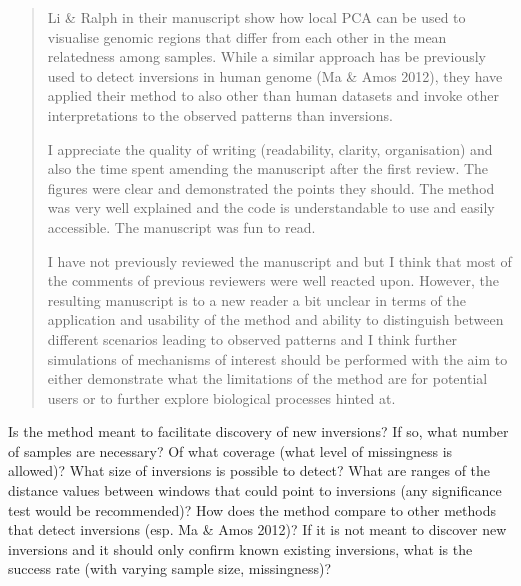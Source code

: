 \reply{
}


\begin{quote}
    Li \& Ralph in their manuscript show how local PCA can be used to visualise genomic regions that differ from each other in the mean relatedness among samples. While a similar approach has be previously used to detect inversions in human genome (Ma & Amos 2012), they have applied their method to also other than human datasets and invoke other interpretations to the observed patterns than inversions.

    I appreciate the quality of writing (readability, clarity, organisation) and also the time spent amending the manuscript after the first review. The figures were clear and demonstrated the points they should. The method was very well explained and the code is understandable to use and easily accessible. The manuscript was fun to read.

    I have not previously reviewed the manuscript and but I think that most of the comments of previous reviewers were well reacted upon. However, the resulting manuscript is to a new reader a bit unclear in terms of the application and usability of the method and ability to distinguish between different scenarios leading to observed patterns and I think further simulations of mechanisms of interest should be performed with the aim to either demonstrate what the limitations of the method are for potential users or to further explore biological processes hinted at.
\end{quote}

\begin{point}{}
    Is the method meant to facilitate discovery of new inversions? If so, what number of samples are necessary? Of what coverage (what level of missingness is allowed)? What size of inversions is possible to detect? What are ranges of the distance values between windows that could point to inversions (any significance test would be recommended)? How does the method compare to other methods that detect inversions (esp. Ma & Amos 2012)? If it is not meant to discover new inversions and it should only confirm known existing inversions, what is the success rate (with varying sample size, missingness)?
\end{point}

\reply{
}

